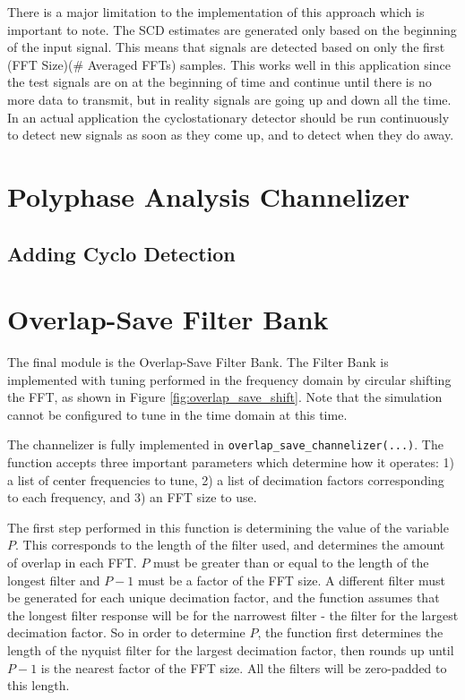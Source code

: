 \documentclass[12pt]{report}
\begin{document}
There is a major limitation to the implementation of this approach which is
important to note.  The SCD estimates are generated only based on the beginning
of the input signal. This means that signals are detected based on only the
first (FFT Size)(# Averaged FFTs) samples. This works well in this application
since the test signals are on at the beginning of time and continue until there
is no more data to transmit, but in reality signals are going up and down
all the time. In an actual application the cyclostationary detector should be
run continuously to detect new signals as soon as they come up, and to detect
when they do away.

\section{Polyphase Analysis Channelizer}
\label{sec:sim_poly}

\subsection{Adding Cyclo Detection}
\label{sec:sim_poly_cyclo}

\section{Overlap-Save Filter Bank}
\label{sec:sim_os}
The final module is the Overlap-Save Filter Bank. The Filter Bank is
implemented with tuning performed in the frequency domain by circular shifting
the FFT, as shown in Figure \ref{fig:overlap_save_shift}. Note that the
simulation cannot be configured to tune in the time domain at this time.

The channelizer is fully implemented in \texttt{overlap\_save\_channelizer(...)}.
The function accepts three important parameters which determine how it
operates: 1) a list of center frequencies to tune, 2) a list of decimation
factors corresponding to each frequency, and 3) an FFT size to use.

The first step performed in this function is determining the value of the
variable $P$. This corresponds to the length of the filter used, and determines
the amount of overlap in each FFT. $P$ must be greater than or equal to the
length of the longest filter and $P-1$ must be a factor of the FFT size.
A different filter must be generated for each unique decimation factor, and the
function assumes that the longest filter response will be for the narrowest
filter - the filter for the largest decimation factor. So in order to determine
$P$, the function first determines the length of the nyquist filter for the
largest decimation factor, then rounds up until $P-1$ is the nearest factor of
the FFT size. All the filters will be zero-padded to this length.
\end{document}
